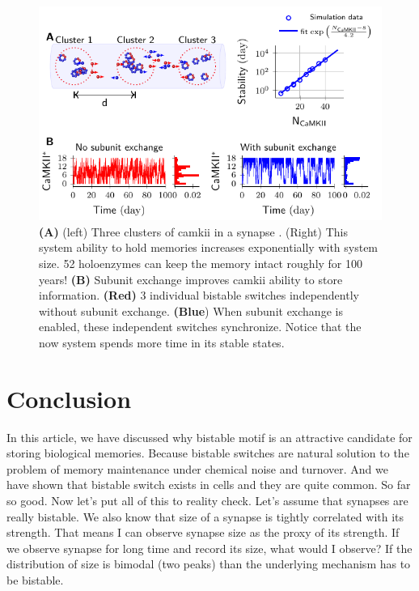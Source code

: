 \documentclass[]{resonance}
\begin{document}
\begin{figure}[t!]
    \caption{ \textbf{(A)} (left) Three clusters of \gls{camkii} in a synapse
        . (Right) This system ability to hold memories increases exponentially
        with system size. 52 holoenzymes can keep the memory intact roughly for
        100 years! \textbf{(B)} Subunit exchange improves \gls{camkii} ability
        to store information. \textbf{(Red)} 3 individual bistable switches independently  
        without subunit exchange. \textbf{(Blue}) When subunit exchange is enabled, these 
        independent switches synchronize. Notice that the now system spends more 
        time in its stable states.
    }\label{fig:camkii_sync}
    \includegraphics[width=\linewidth]{./bistable/Fig5/figure_sync_114mm.pdf}
\end{figure}


\section{Conclusion}

In this article, we have discussed why bistable motif is an attractive candidate
for storing biological memories. Because bistable switches are natural solution
to the problem of memory maintenance under chemical noise and turnover. And we
have shown that bistable switch exists in cells and they are quite common. So
far so good. Now let's put all of this to reality check. Let's assume that
synapses are really bistable. We also know that size of a synapse is tightly
correlated with its strength. That means I can observe synapse size as the proxy
of its strength. If we observe synapse for long time and record its size, what
would I observe? If the distribution of size is bimodal (two peaks) than the
underlying mechanism has to be bistable.
\end{document}

